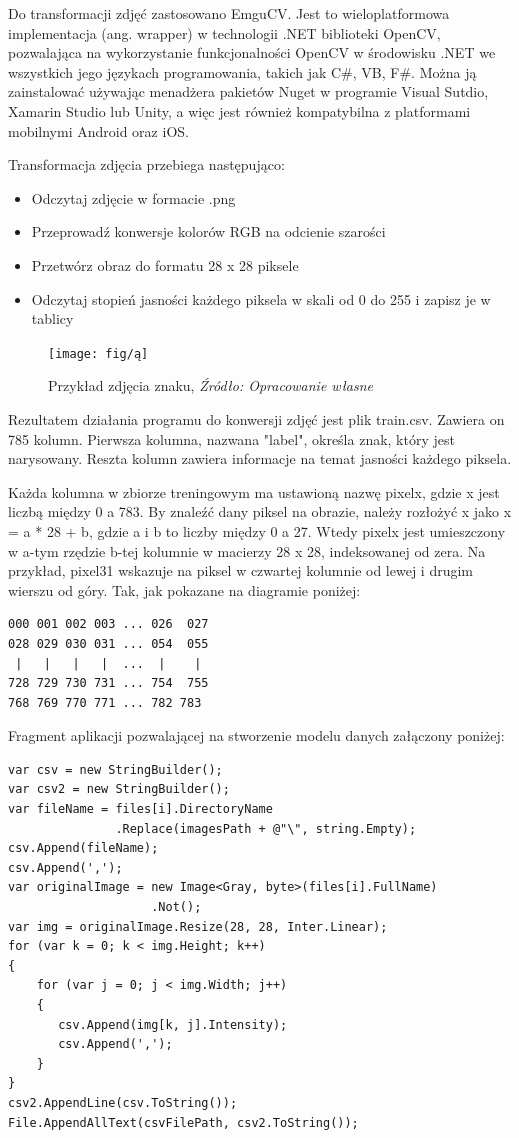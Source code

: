 \documentclass[brudnopis]{xmgr}
\begin{document}
Do transformacji zdjęć zastosowano EmguCV\cite{18}. Jest to wieloplatformowa implementacja (ang. wrapper) w technologii .NET biblioteki OpenCV, pozwalająca na wykorzystanie funkcjonalności OpenCV\cite{21} w środowisku .NET we wszystkich jego językach programowania, takich jak C\#, VB, F\#\cite{1}. Można ją zainstalować używając menadżera pakietów Nuget w programie Visual Sutdio, Xamarin Studio lub Unity, a więc jest również kompatybilna z platformami mobilnymi Android oraz iOS.

Transformacja zdjęcia przebiega następująco:
\begin{itemize}
\item
Odczytaj zdjęcie w formacie .png
\item
Przeprowadź konwersje kolorów RGB na odcienie szarości
\item
Przetwórz obraz do formatu 28 x 28 piksele
\item
Odczytaj stopień jasności każdego piksela w skali od 0 do 255 i zapisz je w tablicy
\end{itemize}

\begin{figure}[!tbh]
\centering
\texttt{[image: fig/ą]}
\caption{Przykład zdjęcia znaku, \emph{Źródło: Opracowanie własne}}
\end{figure}
Rezultatem działania programu do konwersji zdjęć jest plik train.csv. Zawiera on 785 kolumn. Pierwsza kolumna, nazwana "label", określa znak, który jest narysowany. Reszta kolumn zawiera informacje na temat jasności każdego piksela.

Każda kolumna w zbiorze treningowym ma ustawioną nazwę pixelx, gdzie x jest liczbą między 0 a 783. By znaleźć dany piksel na obrazie, należy rozłożyć x jako x = a * 28 + b, gdzie a i b to liczby między 0 a 27. Wtedy pixelx jest umieszczony w a-tym rzędzie b-tej kolumnie w macierzy 28 x 28, indeksowanej od zera. Na przykład, pixel31 wskazuje na piksel w czwartej kolumnie od lewej i drugim wierszu od góry. Tak, jak pokazane na diagramie poniżej:

\begin{lstlisting}
000 001 002 003 ... 026  027
028 029 030 031 ... 054  055
 |   |   |   |  ...  |    |
728 729 730 731 ... 754  755
768 769 770 771 ... 782 783 
\end{lstlisting} 
\newpage

Fragment aplikacji pozwalającej na stworzenie modelu danych załączony poniżej:

\begin{verbatim}
var csv = new StringBuilder();
var csv2 = new StringBuilder();
var fileName = files[i].DirectoryName
               .Replace(imagesPath + @"\", string.Empty);
csv.Append(fileName);
csv.Append(',');
var originalImage = new Image<Gray, byte>(files[i].FullName)
                    .Not();
var img = originalImage.Resize(28, 28, Inter.Linear);
for (var k = 0; k < img.Height; k++)
{
    for (var j = 0; j < img.Width; j++)
    {
       csv.Append(img[k, j].Intensity);
       csv.Append(',');
    }
}
csv2.AppendLine(csv.ToString());
File.AppendAllText(csvFilePath, csv2.ToString());
\end{verbatim}
\end{document}
